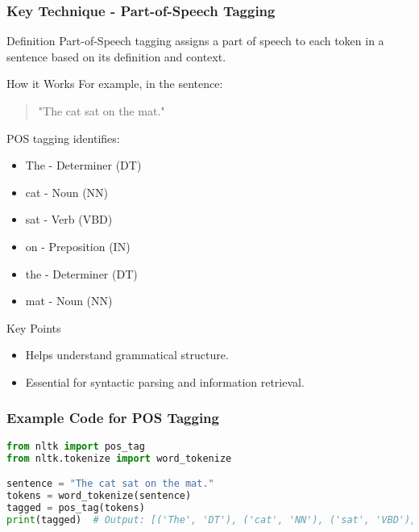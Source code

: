 \documentclass[aspectratio=169]{beamer}
\begin{document}
\begin{frame}[fragile]
    \frametitle{Key Technique - Part-of-Speech Tagging}
    \begin{block}{Definition}
        Part-of-Speech tagging assigns a part of speech to each token in a sentence based on its definition and context.
    \end{block}

    \begin{block}{How it Works}
        For example, in the sentence:
        \begin{quote}
            "The cat sat on the mat."
        \end{quote}
        POS tagging identifies:
        \begin{itemize}
            \item The - Determiner (DT)
            \item cat - Noun (NN)
            \item sat - Verb (VBD)
            \item on - Preposition (IN)
            \item the - Determiner (DT)
            \item mat - Noun (NN)
        \end{itemize}
    \end{block}

    \begin{block}{Key Points}
        \begin{itemize}
            \item Helps understand grammatical structure.
            \item Essential for syntactic parsing and information retrieval.
        \end{itemize}
    \end{block}
\end{frame}

\begin{frame}[fragile]
    \frametitle{Example Code for POS Tagging}
    \begin{lstlisting}[language=Python]
from nltk import pos_tag
from nltk.tokenize import word_tokenize

sentence = "The cat sat on the mat."
tokens = word_tokenize(sentence)
tagged = pos_tag(tokens)
print(tagged)  # Output: [('The', 'DT'), ('cat', 'NN'), ('sat', 'VBD'), ('on', 'IN'), ('the', 'DT'), ('mat', 'NN')]
    \end{lstlisting}
\end{frame}
\end{document}

